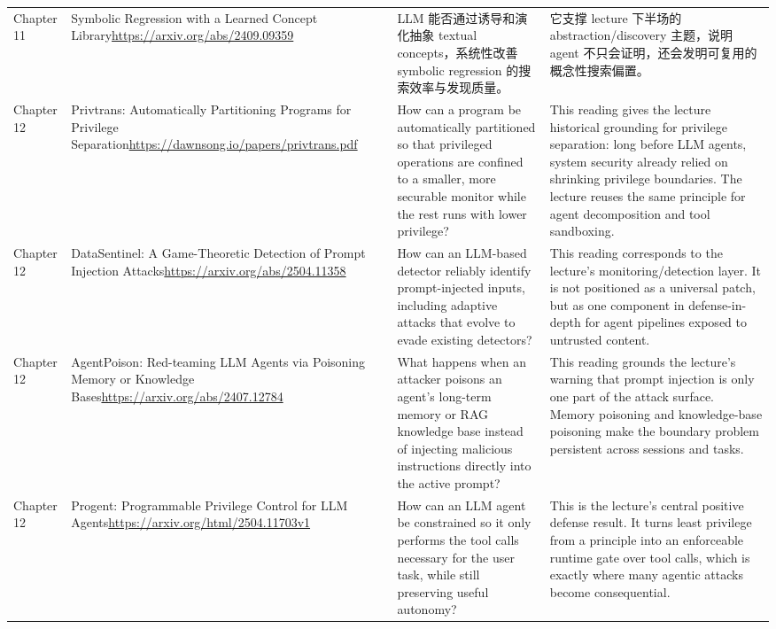 \begin{longtable}{p{}p{}p{}p{}}
Chapter 11 & Symbolic Regression with a Learned Concept Library\newline\url{https://arxiv.org/abs/2409.09359} & LLM 能否通过诱导和演化抽象 textual concepts，系统性改善 symbolic regression 的搜索效率与发现质量。 & 它支撑 lecture 下半场的 abstraction/discovery 主题，说明 agent 不只会证明，还会发明可复用的概念性搜索偏置。 \\
Chapter 12 & Privtrans: Automatically Partitioning Programs for Privilege Separation\newline\url{https://dawnsong.io/papers/privtrans.pdf} & How can a program be automatically partitioned so that privileged operations are confined to a smaller, more securable monitor while the rest runs with lower privilege? & This reading gives the lecture historical grounding for privilege separation: long before LLM agents, system security already relied on shrinking privilege boundaries. The lecture reuses the same principle for agent decomposition and tool sandboxing. \\
Chapter 12 & DataSentinel: A Game-Theoretic Detection of Prompt Injection Attacks\newline\url{https://arxiv.org/abs/2504.11358} & How can an LLM-based detector reliably identify prompt-injected inputs, including adaptive attacks that evolve to evade existing detectors? & This reading corresponds to the lecture's monitoring/detection layer. It is not positioned as a universal patch, but as one component in defense-in-depth for agent pipelines exposed to untrusted content. \\
Chapter 12 & AgentPoison: Red-teaming LLM Agents via Poisoning Memory or Knowledge Bases\newline\url{https://arxiv.org/abs/2407.12784} & What happens when an attacker poisons an agent's long-term memory or RAG knowledge base instead of injecting malicious instructions directly into the active prompt? & This reading grounds the lecture's warning that prompt injection is only one part of the attack surface. Memory poisoning and knowledge-base poisoning make the boundary problem persistent across sessions and tasks. \\
Chapter 12 & Progent: Programmable Privilege Control for LLM Agents\newline\url{https://arxiv.org/html/2504.11703v1} & How can an LLM agent be constrained so it only performs the tool calls necessary for the user task, while still preserving useful autonomy? & This is the lecture's central positive defense result. It turns least privilege from a principle into an enforceable runtime gate over tool calls, which is exactly where many agentic attacks become consequential. \\
\bottomrule
\end{longtable}
\normalsize
